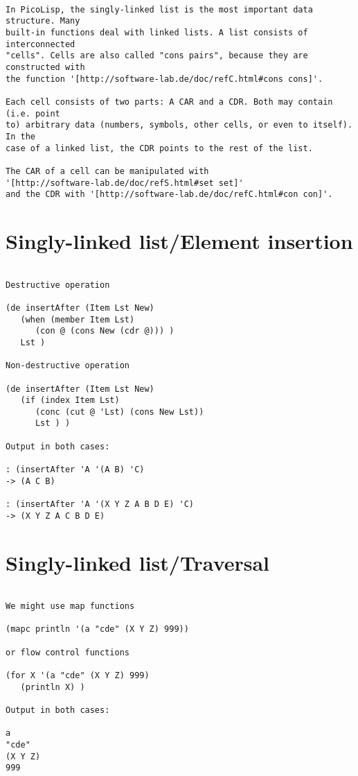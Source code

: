 \begin{verbatim}

In PicoLisp, the singly-linked list is the most important data structure. Many
built-in functions deal with linked lists. A list consists of interconnected
"cells". Cells are also called "cons pairs", because they are constructed with
the function '[http://software-lab.de/doc/refC.html#cons cons]'.

Each cell consists of two parts: A CAR and a CDR. Both may contain (i.e. point
to) arbitrary data (numbers, symbols, other cells, or even to itself). In the
case of a linked list, the CDR points to the rest of the list.

The CAR of a cell can be manipulated with
'[http://software-lab.de/doc/refS.html#set set]'
and the CDR with '[http://software-lab.de/doc/refC.html#con con]'.

\end{verbatim}

\section*{Singly-linked list/Element insertion}

\begin{verbatim}

Destructive operation

(de insertAfter (Item Lst New)
   (when (member Item Lst)
      (con @ (cons New (cdr @))) )
   Lst )

Non-destructive operation

(de insertAfter (Item Lst New)
   (if (index Item Lst)
      (conc (cut @ 'Lst) (cons New Lst))
      Lst ) )

Output in both cases:

: (insertAfter 'A '(A B) 'C)
-> (A C B)

: (insertAfter 'A '(X Y Z A B D E) 'C)
-> (X Y Z A C B D E)

\end{verbatim}

\section*{Singly-linked list/Traversal}

\begin{verbatim}

We might use map functions

(mapc println '(a "cde" (X Y Z) 999))

or flow control functions

(for X '(a "cde" (X Y Z) 999)
   (println X) )

Output in both cases:

a
"cde"
(X Y Z)
999

\end{verbatim}

